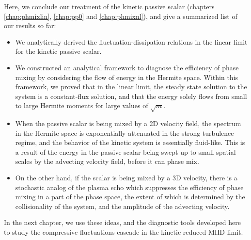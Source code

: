     Here, we conclude our
    treatment of the kinetic passive scalar (chapters \ref{chap:phmixlin}, \ref{chap:pp0}
    and \ref{chap:phmixnl}), and give a summarized list of our results so
    far:
    \begin{itemize}
        \item We analytically derived the fluctuation-dissipation relations in the linear
        limit for the kinetic passive scalar.

        \item We constructed an analytical framework to diagnose the efficiency of phase
        mixing by considering the flow of energy in the Hermite space. Within this
        framework, we proved that
        in the linear limit, the steady state solution to the system is a constant-flux
        solution, and that the energy solely flows from small to large Hermite moments for
        large values of $\sqrt{m}$.

        \item When the passive scalar is being mixed by a 2D velocity field,
        the spectrum in the Hermite space is exponentially attenuated in the strong turbulence regime, and the
        behavior of the kinetic system is essentially fluid-like. This is a result of the
        energy in the passive scalar being swept up to small spatial scales by the
        advecting velocity field, before it can phase mix.

        \item On the other hand, if the scalar is being mixed by a 3D velocity, there is a stochastic analog of the plasma
        echo which suppresses the 
        efficiency of phase mixing in a part of the phase space, the
        extent of which is determined by the collisionality of the system, and the
        amplitude of the advecting velocity. 
    \end{itemize}

    In the next chapter, we use these ideas, and the diagnostic tools developed here to study the compressive
    fluctuations cascade in the kinetic reduced MHD limit.
    
